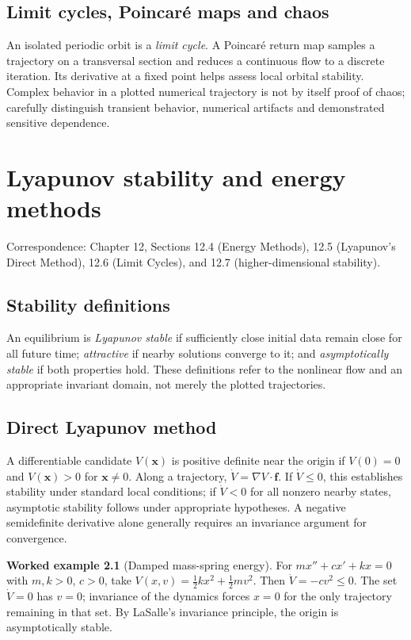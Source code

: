 \documentclass[11pt,letterpaper,oneside]{report}
\theoremstyle{definition}\newtheorem{definition}[theorem]{Definition}
\newtheorem{example}[theorem]{Worked example}
\theoremstyle{remark}\newtheorem{remark}[theorem]{Remark}
\begin{document}
\section{Limit cycles, Poincar\'e maps and chaos}
An isolated periodic orbit is a \emph{limit cycle}. A Poincar\'e return map samples a trajectory on a transversal section and reduces a continuous flow to a discrete iteration. Its derivative at a fixed point helps assess local orbital stability. Complex behavior in a plotted numerical trajectory is not by itself proof of chaos; carefully distinguish transient behavior, numerical artifacts and demonstrated sensitive dependence.
\chapter{Lyapunov stability and energy methods}
\begin{bookground}Correspondence: Chapter 12, Sections 12.4 (Energy Methods), 12.5 (Lyapunov's Direct Method), 12.6 (Limit Cycles), and 12.7 (higher-dimensional stability).\end{bookground}
\section{Stability definitions}
An equilibrium is \emph{Lyapunov stable} if sufficiently close initial data remain close for all future time; \emph{attractive} if nearby solutions converge to it; and \emph{asymptotically stable} if both properties hold. These definitions refer to the nonlinear flow and an appropriate invariant domain, not merely the plotted trajectories.
\section{Direct Lyapunov method}
A differentiable candidate $V(\mathbf x)$ is positive definite near the origin if $V(0)=0$ and $V(\mathbf x)>0$ for $\mathbf x\ne0$. Along a trajectory, $\dot V=\nabla V\cdot\mathbf f$. If $\dot V\le0$, this establishes stability under standard local conditions; if $\dot V<0$ for all nonzero nearby states, asymptotic stability follows under appropriate hypotheses. A negative semidefinite derivative alone generally requires an invariance argument for convergence.
\begin{example}[Damped mass-spring energy]
For $m x''+c x'+kx=0$ with $m,k>0$, $c>0$, take $V(x,v)=\frac12kx^2+\frac12mv^2$. Then $\dot V=-cv^2\le0$. The set $\dot V=0$ has $v=0$; invariance of the dynamics forces $x=0$ for the only trajectory remaining in that set. By LaSalle's invariance principle, the origin is asymptotically stable.
\end{example}
\end{document}
